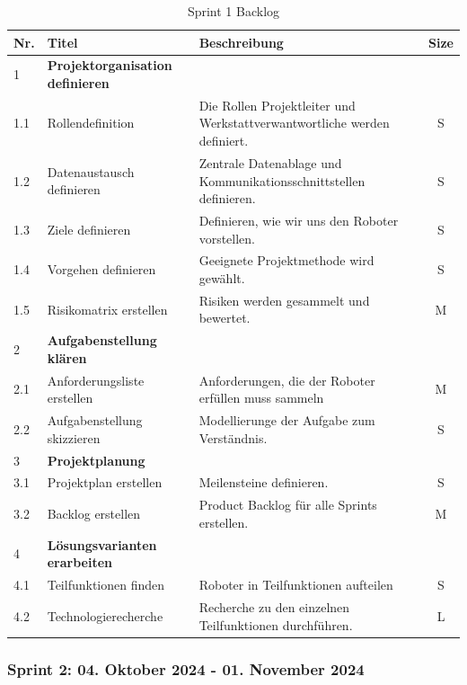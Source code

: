 \begin{table}[H]
\centering
\small
\begin{tabularx}{\textwidth}{|l|l|X|c|}
\hline
  \textbf{Nr.} & \textbf{Titel} & \textbf{Beschreibung} & \textbf{Size}\\
  \hline
  1  & \textbf{Projektorganisation definieren} &&\\
  \hline
  1.1  & Rollendefinition & Die Rollen Projektleiter und Werkstattverwantwortliche werden definiert. & S\\
  \hline
  1.2 & Datenaustausch definieren & Zentrale Datenablage und Kommunikationsschnittstellen definieren.& S\\
  \hline
  1.3 & Ziele definieren & Definieren, wie wir uns den Roboter vorstellen. & S\\
  \hline
  1.4 & Vorgehen definieren & Geeignete Projektmethode wird gewählt. & S\\
  \hline
    1.5 & Risikomatrix erstellen & Risiken werden gesammelt und bewertet. & M\\
  \hline
  2 & \textbf{Aufgabenstellung klären} && \\
  \hline
  2.1 & Anforderungsliste erstellen & Anforderungen, die der Roboter erfüllen muss sammeln& M \\
  \hline
  2.2 & Aufgabenstellung skizzieren & Modellierunge der Aufgabe zum Verständnis. & S \\
  \hline
  3 & \textbf{Projektplanung} && \\
  \hline
  3.1 & Projektplan erstellen & Meilensteine definieren. & S \\
  \hline
  3.2 & Backlog erstellen & Product Backlog für alle Sprints erstellen. & M \\
  \hline
  4 & \textbf{Lösungsvarianten erarbeiten} && \\
  \hline
  4.1 & Teilfunktionen finden & Roboter in Teilfunktionen aufteilen & S \\
  \hline
  4.2 & Technologierecherche & Recherche zu den einzelnen Teilfunktionen  durchführen. & L\\
  \hline
 
\end{tabularx}
\caption{Sprint 1 Backlog}
\label{table:sprint1-backlog}
\end{table}

\newpage
\subsubsection{Sprint 2: 04. Oktober 2024 - 01. November 2024}

